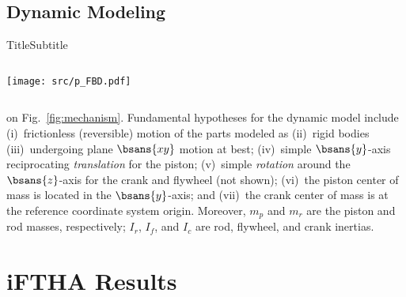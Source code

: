 \subsection{Dynamic Modeling}

    \begin{frame}{Title}{Subtitle}\vspace*{-2em}
        \begin{columns}

        \vspace*{-4mm}%
        \hspace*{-6mm}\texttt{[image: src/p\_FBD.pdf]}

        \end{columns}
    \end{frame}

    on  Fig.~\ref{fig:mechanism}.  Fundamental  hypotheses  for  the   dynamic   model   include
    (i)~frictionless  (reversible)  motion  of  the   parts   modeled   as   (ii)~rigid   bodies
    (iii)~undergoing  plane  $\bsans{xy}$   motion   at   best;   (iv)~simple   $\bsans{y}$-axis
    reciprocating \emph{translation} for  the  piston;  (v)~simple  \emph{rotation}  around  the
    $\bsans{z}$-axis for the crank and flywheel (not shown); (vi)~the piston center of  mass  is
    located in the $\bsans{y}$-axis; and (vii)~the crank center of  mass  is  at  the  reference
    coordinate system origin.  Moreover,  $m_p$  and  $m_r$  are  the  piston  and  rod  masses,
    respectively; $I_r$, $I_f$, and $I_c$ are rod, flywheel, and crank inertias.

\section{iFTHA Results}

